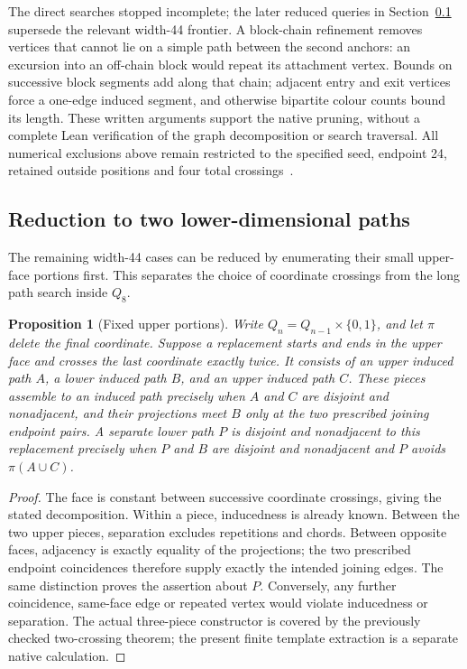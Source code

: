\documentclass[11pt,a4paper]{article}
\newtheorem{proposition}[theorem]{Proposition}
\theoremstyle{definition}
\theoremstyle{remark}
\begin{document}
The direct searches stopped incomplete; the later reduced queries in
Section~\ref{sec:lowerpair227} supersede the relevant width-44 frontier.
A block-chain refinement
removes vertices that cannot lie on a simple path between the second
anchors: an excursion into an off-chain block would repeat its attachment
vertex. Bounds on successive block segments add along that chain; adjacent
entry and exit vertices force a one-edge induced segment, and otherwise
bipartite colour counts bound its length. These written arguments support
the native pruning, without a complete Lean verification of the graph
decomposition or search traversal. All numerical exclusions above remain
restricted to the specified seed, endpoint 24, retained outside positions
and four total crossings~\cite{research226}.

\subsection{Reduction to two lower-dimensional paths}
\label{sec:lowerpair227}
The remaining width-44 cases can be reduced by enumerating their small
upper-face portions first. This separates the choice of coordinate
crossings from the long path search inside $Q_8$.

\begin{proposition}[Fixed upper portions]
\label{prop:fixedupper227}
Write $Q_n=Q_{n-1}\times\{0,1\}$, and let $\pi$ delete the final coordinate.
Suppose a replacement starts and ends in the upper face and crosses the
last coordinate exactly twice. It consists of an upper induced path $A$,
a lower induced path $B$, and an upper induced path $C$.
These pieces assemble to an induced path precisely when $A$ and $C$
are disjoint and nonadjacent, and their projections meet $B$ only at
the two prescribed joining endpoint pairs. A separate lower path $P$
is disjoint and nonadjacent to this replacement precisely when $P$ and
$B$ are disjoint and nonadjacent and $P$ avoids $\pi(A\cup C)$.
\end{proposition}
\begin{proof}
The face is constant between successive coordinate crossings, giving
the stated decomposition. Within a piece, inducedness is already known.
Between the two upper pieces, separation excludes repetitions and chords.
Between opposite faces, adjacency is exactly equality of the projections;
the two prescribed endpoint coincidences therefore supply exactly the
intended joining edges. The same distinction proves the assertion about
$P$. Conversely, any further coincidence, same-face edge or repeated
vertex would violate inducedness or separation. The actual three-piece
constructor is covered by the previously checked two-crossing theorem;
the present finite template extraction is a separate native calculation.
\end{proof}
\end{document}

